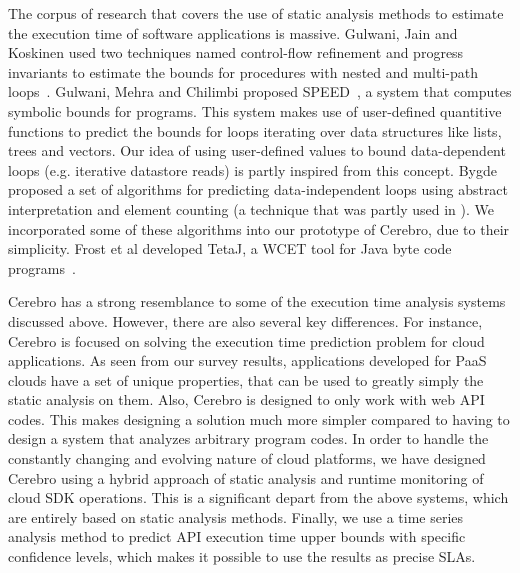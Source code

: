 The corpus of research that covers the use of static analysis methods to estimate the execution 
time of software applications is massive. Gulwani, Jain and Koskinen used two techniques named control-flow
 refinement and progress invariants to estimate the bounds for procedures with nested and multi-path loops~\cite{Gulwani:2009:CRP:1542476.1542518}.
 Gulwani, Mehra and Chilimbi proposed SPEED~\cite{Gulwani:2009:SPE:1480881.1480898}, a system that computes symbolic bounds for programs. This
 system makes use of user-defined quantitive functions to predict the bounds for loops iterating over
data structures like lists, trees and vectors. Our idea of using user-defined values to bound
 data-dependent loops (e.g. iterative datastore reads) is partly inspired from this concept.
 Bygde~\cite{bygde2010static} proposed a set of algorithms for predicting data-independent loops using abstract interpretation
 and element counting (a technique that was partly used in \cite{ermedahl2007loop}). We incorporated some
 of these algorithms into our prototype of Cerebro, due to their simplicity. Frost et al developed TetaJ, a WCET
 tool for Java byte code programs~\cite{Frost:2011:WAJ:2043910.2043916}.
 
Cerebro has a strong resemblance to some of the execution time analysis systems discussed above.
However, there are also several key differences. For instance, Cerebro is focused on solving the
execution time prediction problem for cloud applications. As seen from our survey results, applications 
developed for PaaS clouds have a set of unique properties, that can be used to greatly simply the
static analysis on them. Also, Cerebro is designed to only work with web API codes. This makes designing 
a solution much more simpler compared to having to design a system that analyzes arbitrary program codes.
In order to handle the constantly changing and evolving nature of cloud platforms, we have designed
Cerebro using a hybrid approach of static analysis and runtime monitoring of cloud SDK operations. This is
a significant depart from the above systems, which are entirely based on static analysis methods. Finally,
we use a time series analysis method to predict API execution time upper bounds with specific confidence
levels, which makes it possible to use the results as precise SLAs.

